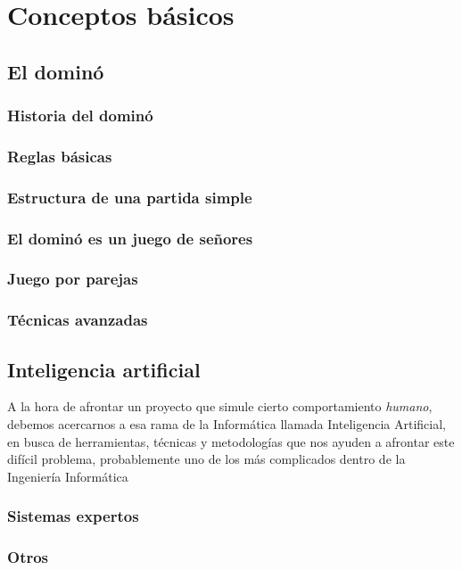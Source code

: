 

\section{Conceptos básicos}

\subsection{El dominó}

\subsubsection{Historia del dominó}

\subsubsection{Reglas básicas}
\subsubsection{Estructura de una partida simple}
\subsubsection{El dominó es un juego de señores}
\subsubsection{Juego por parejas}
\subsubsection{Técnicas avanzadas}

\subsection{Inteligencia artificial}

A la hora de afrontar un proyecto que simule cierto comportamiento \emph{humano}, debemos acercarnos a esa rama de la
Informática llamada Inteligencia Artificial, en busca de herramientas, técnicas y metodologías que nos ayuden a afrontar este
difícil problema, probablemente uno de los más complicados dentro de la Ingeniería Informática

\subsubsection{Sistemas expertos}
\subsubsection{Otros}
